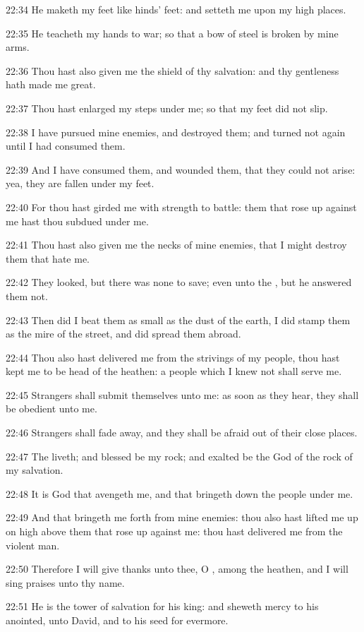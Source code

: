 22:34 He maketh my feet like hinds' feet: and setteth me upon my high
places.

22:35 He teacheth my hands to war; so that a bow of steel is broken by
mine arms.

22:36 Thou hast also given me the shield of thy salvation: and thy
gentleness hath made me great.

22:37 Thou hast enlarged my steps under me; so that my feet did not
slip.

22:38 I have pursued mine enemies, and destroyed them; and turned not
again until I had consumed them.

22:39 And I have consumed them, and wounded them, that they could not
arise: yea, they are fallen under my feet.

22:40 For thou hast girded me with strength to battle: them that rose
up against me hast thou subdued under me.

22:41 Thou hast also given me the necks of mine enemies, that I might
destroy them that hate me.

22:42 They looked, but there was none to save; even unto the \LORD, but
he answered them not.

22:43 Then did I beat them as small as the dust of the earth, I did
stamp them as the mire of the street, and did spread them abroad.

22:44 Thou also hast delivered me from the strivings of my people,
thou hast kept me to be head of the heathen: a people which I knew not
shall serve me.

22:45 Strangers shall submit themselves unto me: as soon as they hear,
they shall be obedient unto me.

22:46 Strangers shall fade away, and they shall be afraid out of their
close places.

22:47 The \LORD liveth; and blessed be my rock; and exalted be the God
of the rock of my salvation.

22:48 It is God that avengeth me, and that bringeth down the people
under me.

22:49 And that bringeth me forth from mine enemies: thou also hast
lifted me up on high above them that rose up against me: thou hast
delivered me from the violent man.

22:50 Therefore I will give thanks unto thee, O \LORD, among the
heathen, and I will sing praises unto thy name.

22:51 He is the tower of salvation for his king: and sheweth mercy to
his anointed, unto David, and to his seed for evermore.

